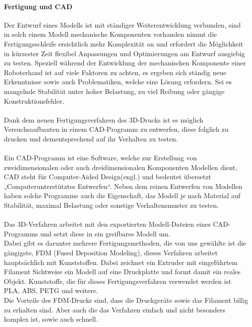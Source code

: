 \documentclass[titlepage,12pt,twoside]{article}
\begin{document}
\paragraph{Fertigung und CAD}
\hfill \break
\hfill \break
Der Entwurf eines Modells ist mit ständiger Weiterentwicklung verbunden, sind in 
solch einem Modell mechanische Komponenten vorhanden nimmt die Fertigungsschleife 
ersichtlich mehr Komplexität an und erfordert die Möglichkeit in kürzester Zeit 
flexibel Anpassungen und Optimierungen am Entwurf ausgiebig zu testen. Speziell 
während der Entwicklung der mechanischen Komponente einer Roboterhand ist auf 
viele Faktoren zu achten, es ergeben sich ständig neue Erkenntnisse sowie auch 
Problematiken, welche eine Lösung erfordern. Sei es mangelnde Stabilität unter 
hoher Belastung, zu viel Reibung oder gängige Konstruktionsfehler. \\
\\
Dank dem neuen Fertigungsverfahren des 3D-Drucks ist es möglich Versuchsaufbauten 
in einem CAD-Programm zu entwerfen, diese folglich zu drucken und dementsprechend 
auf ihr Verhalten zu testen. \\
\\
Ein CAD-Programm ist eine Software, welche zur Erstellung von zweidimensionalen 
oder auch dreidimensionalen Komponenten Modellen dient, CAD steht für Computer-Aided 
Design(engl.) und bedeutet übersetzt „Computerunterstütztes Entwerfen“. Neben 
dem reinen Entwerfen von Modellen haben solche Programme auch die Eigenschaft, 
das Modell je nach Material auf Stabilität, maximal Belastung oder sonstige 
Verhaltensmuster zu testen. \\
\\
Das 3D-Verfahren arbeitet mit den exportierten Modell-Dateien eines CAD-Programms 
und setzt diese in ein greifbares Modell um. \\
Dabei gibt es darunter mehrere Fertigungsmethoden, die von uns gewählte ist die 
gängigste, FDM (Fused Deposition Modeling), dieses Verfahren arbeitet hauptsächlich 
mit Kunststoffen. Dabei zeichnet ein Extruder mit eingeführtem Filament Sichtweise 
ein Modell auf eine Druckplatte und formt damit ein reales Objekt. Kunststoffe, 
die für dieses Fertigungsverfahren verwendet werden ist PLA, ABS, PETG und weitere. \\
Die Vorteile des FDM-Drucks sind, dass die Druckgeräte sowie das Filament billig 
zu erhalten sind. Aber auch die das Verfahren einfach und nicht besonders komplex 
ist, sowie auch schnell. \\
\\
\end{document}
